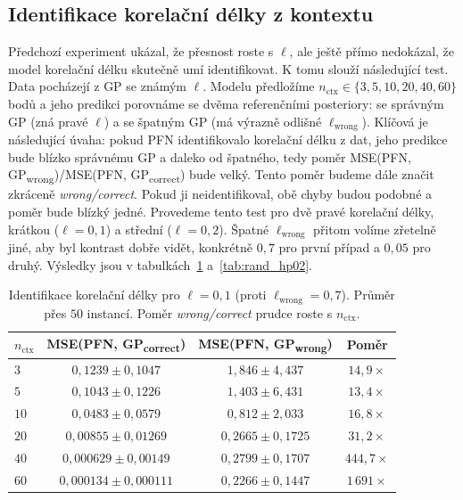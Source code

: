 \subsection{Identifikace korelační délky z kontextu}
\label{subsec:identifikace-delky}

Předchozí experiment ukázal, že přesnost roste s $\ell$, ale ještě přímo nedokázal, že model korelační délku skutečně umí identifikovat.
K tomu slouží následující test.
Data pocházejí z GP se známým $\ell$.
Modelu předložíme $n_{\text{ctx}} \in \{3, 5, 10, 20, 40, 60\}$ bodů a jeho predikci porovnáme se dvěma referenčními posteriory: se správným GP (zná pravé $\ell$) a se špatným GP (má výrazně odlišné $\ell_{\text{wrong}}$).
Klíčová je následující úvaha: pokud PFN identifikovalo korelační délku z dat, jeho predikce bude blízko správnému GP a daleko od špatného, tedy poměr MSE(PFN, GP\textsubscript{wrong})/MSE(PFN, GP\textsubscript{correct}) bude velký.
Tento poměr budeme dále značit zkráceně \emph{wrong/correct}.
Pokud ji neidentifikoval, obě chyby budou podobné a poměr bude blízký jedné.
Provedeme tento test pro dvě pravé korelační délky, krátkou ($\ell = 0{,}1$) a střední ($\ell = 0{,}2$).
Špatné $\ell_{\text{wrong}}$ přitom volíme zřetelně jiné, aby byl kontrast dobře vidět, konkrétně $0{,}7$ pro první případ a $0{,}05$ pro druhý.
Výsledky jsou v tabulkách~\ref{tab:rand_hp01} a~\ref{tab:rand_hp02}.
\par

\begin{table}[htbp]
\centering
\begin{tabular}{lccc}
\hline
$n_{\text{ctx}}$ & MSE(PFN, GP\textsubscript{correct}) & MSE(PFN, GP\textsubscript{wrong}) & Poměr \\
\hline
$3$  & $0{,}1239 \pm 0{,}1047$ & $1{,}846 \pm 4{,}437$ & $14{,}9\times$ \\
$5$  & $0{,}1043 \pm 0{,}1226$ & $1{,}403 \pm 6{,}431$ & $13{,}4\times$ \\
$10$ & $0{,}0483 \pm 0{,}0579$ & $0{,}812 \pm 2{,}033$ & $16{,}8\times$ \\
$20$ & $0{,}00855 \pm 0{,}01269$ & $0{,}2665 \pm 0{,}1725$ & $31{,}2\times$ \\
$40$ & $0{,}000629 \pm 0{,}00149$ & $0{,}2799 \pm 0{,}1707$ & $444{,}7\times$ \\
$60$ & $0{,}000134 \pm 0{,}000111$ & $0{,}2266 \pm 0{,}1447$ & $1\,691\times$ \\
\hline
\end{tabular}
\caption{Identifikace korelační délky pro $\ell = 0{,}1$ (proti $\ell_{\text{wrong}} = 0{,}7$). Průměr přes $50$ instancí. Poměr \emph{wrong/correct} prudce roste s $n_{\text{ctx}}$.}
\label{tab:rand_hp01}
\end{table}

